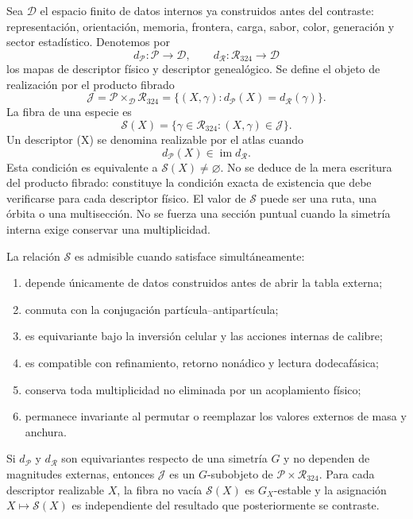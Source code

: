 Sea \(\mathcal D\) el espacio finito de datos internos ya construidos antes del
contraste: representación, orientación, memoria, frontera, carga, sabor,
color, generación y sector estadístico. Denotemos por
\[
 d_{\mathcal P}:\mathcal P\longrightarrow\mathcal D,
 \qquad
 d_{\mathcal R}:\mathcal R_{324}\longrightarrow\mathcal D
\]
los mapas de descriptor físico y descriptor genealógico. Se define el objeto
de realización por el producto fibrado
\[
 \mathcal J
 =\mathcal P\times_{\mathcal D}\mathcal R_{324}
 =\{(X,\gamma):d_{\mathcal P}(X)=d_{\mathcal R}(\gamma)\}.
\]
La fibra de una especie es
\[
\mathscr S(X)=\{\gamma\in\mathcal R_{324}:(X,\gamma)\in\mathcal J\}.
\]
Un descriptor (X) se denomina realizable por el atlas cuando
\[
 d_{\mathcal P}(X)\in\operatorname{im}d_{\mathcal R}.
\]
Esta condición es equivalente a \(\mathscr S(X)\ne\varnothing\). No se deduce
de la mera escritura del producto fibrado: constituye la condición exacta de
existencia que debe verificarse para cada descriptor físico.
El valor de \(\mathscr S\) puede ser una ruta, una órbita o una multisección.
No se fuerza una sección puntual cuando la simetría interna exige conservar
una multiplicidad.

\begin{definition}
La relación \(\mathscr S\) es admisible cuando satisface simultáneamente:
\begin{enumerate}
\item depende únicamente de datos construidos antes de abrir la tabla externa;
\item conmuta con la conjugación partícula--antipartícula;
\item es equivariante bajo la inversión celular y las acciones internas de
      calibre;
\item es compatible con refinamiento, retorno nonádico y lectura
      dodecafásica;
\item conserva toda multiplicidad no eliminada por un acoplamiento físico;
\item permanece invariante al permutar o reemplazar los valores externos de
      masa y anchura.
\end{enumerate}
\end{definition}

\begin{theorem}
Si \(d_{\mathcal P}\) y \(d_{\mathcal R}\) son equivariantes respecto de una
simetría \(G\) y no dependen de magnitudes externas, entonces \(\mathcal J\)
es un \(G\)-subobjeto de \(\mathcal P\times\mathcal R_{324}\). Para cada
descriptor realizable \(X\), la fibra no vacía \(\mathscr S(X)\) es
\(G_X\)-estable y la asignación \(X\mapsto\mathscr S(X)\) es independiente del
resultado que posteriormente se contraste.
\end{theorem}

